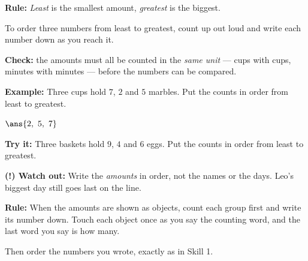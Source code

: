 \documentclass[12pt]{article}
\begin{document}


\begin{formulabox}
\textbf{Rule:} \emph{Least} is the smallest amount, \emph{greatest} is the biggest.\par
To order three numbers from least to greatest, count up out loud and write each number down as you reach it.\par
\textbf{Check:} the amounts must all be counted in the \emph{same unit} --- cups with cups, minutes with minutes --- before the numbers can be compared.
\end{formulabox}

\begin{examplebox}
\textbf{Example:} \quad Three cups hold $7$, $2$ and $5$ marbles. Put the counts in order from least to greatest.

$\ans{2,\ 5,\ 7}$
\end{examplebox}

\begin{tryitbox}
\textbf{Try it:} \quad Three baskets hold $9$, $4$ and $6$ eggs. Put the counts in order from least to greatest.\\[2pt]
\end{tryitbox}

\begin{watchoutbox}
\textbf{(!) Watch out:} Write the \emph{amounts} in order, not the names or the days. Leo's biggest day still goes last on the line.
\end{watchoutbox}


\begin{formulabox}
\textbf{Rule:} When the amounts are shown as objects, count each group first and write its number down. Touch each object once as you say the counting word, and the last word you say is how many.\par
Then order the numbers you wrote, exactly as in Skill 1.
\end{formulabox}
\end{document}
